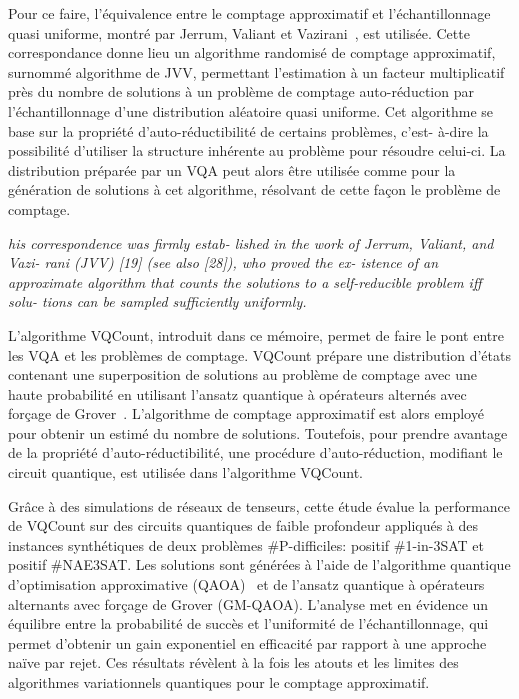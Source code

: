 Pour ce faire, l'équivalence entre le comptage approximatif et l'échantillonnage quasi uniforme, montré par Jerrum, Valiant et Vazirani~\cite{jerrumRandomGenerationCombinatorial1986}, est utilisée. Cette correspondance donne lieu un algorithme randomisé de comptage approximatif, surnommé algorithme de JVV, permettant l'estimation à un facteur multiplicatif près du nombre de solutions à un problème de comptage auto-réduction par l'échantillonnage d'une distribution aléatoire quasi uniforme. Cet algorithme se base sur la propriété d'auto-réductibilité de certains problèmes, c'est-
à-dire la possibilité d'utiliser la structure inhérente au problème pour résoudre celui-ci. La distribution préparée par un VQA peut alors être utilisée comme pour la génération de solutions à cet algorithme, résolvant de cette façon le problème de comptage. 

\textcolor{mydarkred}{\textit{his correspondence was firmly estab-
lished in the work of Jerrum, Valiant, and Vazi-
rani (JVV) [19] (see also [28]), who proved the ex-
istence of an approximate algorithm that counts
the solutions to a self-reducible problem iff solu-
tions can be sampled sufficiently uniformly.}}

L'algorithme VQCount, introduit dans ce mémoire, permet de faire le pont entre les VQA et les problèmes de comptage. VQCount prépare une distribution d'états contenant une superposition de solutions au problème de comptage avec une haute probabilité en utilisant l'ansatz quantique à opérateurs alternés avec forçage de Grover~\cite{bartschiGroverMixersQAOA2020}. L'algorithme de comptage approximatif est alors employé pour obtenir un estimé du nombre de solutions. Toutefois, pour prendre avantage de la propriété d'auto-réductibilité, une procédure d'auto-réduction, modifiant le circuit quantique, est utilisée dans l'algorithme VQCount. 

Grâce à des simulations de réseaux de tenseurs, cette étude évalue la performance de VQCount sur des circuits quantiques de faible profondeur appliqués à des instances synthétiques de deux problèmes \textsf{\#P}-difficiles: positif \#1-in-3SAT et positif \#NAE3SAT. Les solutions sont générées à l'aide de l'algorithme quantique d'optimisation approximative (QAOA)~\cite{farhiQuantumApproximateOptimization2014} et de l'ansatz quantique à opérateurs alternants avec forçage de Grover (GM-QAOA). L'analyse met en évidence un équilibre entre la probabilité de succès et l'uniformité de l'échantillonnage, qui permet d'obtenir un gain exponentiel en efficacité par rapport à une approche naïve par rejet. Ces résultats révèlent à la fois les atouts et les limites des algorithmes variationnels quantiques pour le comptage approximatif.

